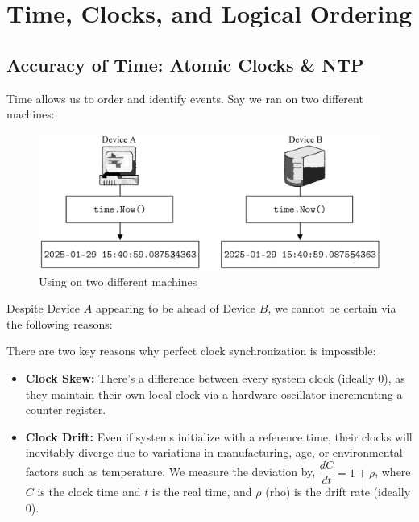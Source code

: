 \newpage

\section{Time, Clocks, and Logical Ordering}
\subsection{Accuracy of Time: Atomic Clocks \& NTP}
\noindent
Time allows us to order and identify events. 
Say we ran  on two different machines:

\begin{figure}[h]
    \centering
    \includegraphics[width=.9\textwidth]{./Sections/time/now.png}
    \caption{Using  on two different machines}
\end{figure}

\noindent
Despite Device $A$ appearing to be ahead of Device $B$, we cannot be certain via 
the following reasons:

\begin{theo}

    There are two key reasons why perfect clock synchronization is impossible:

    \begin{itemize}
        \item \textbf{Clock Skew:} There's a difference between every system clock (ideally 0), as they maintain their own local clock via a hardware oscillator incrementing a counter register.
        \item \textbf{Clock Drift:} Even if systems initialize with a reference time, their clocks will inevitably diverge due to variations in manufacturing, age, or environmental factors such as temperature.
        We measure the deviation by, $\dfrac{dC}{dt}=1+\rho$, where $C$ is the clock time and $t$ is the real time, and $\rho$ (rho) is the drift rate (ideally 0).
    \end{itemize}
\end{theo}

